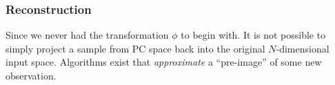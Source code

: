 \subsubsection{Reconstruction}

\begin{frame}{\subsubsecname}


Since we never had the transformation $\phi$ to begin with. 
It is not possible to simply project a sample from PC space back into the original $N$-dimensional input space. 
Algorithms exist that \emph{approximate} a ``pre-image'' of some new observation.

\end{frame}
